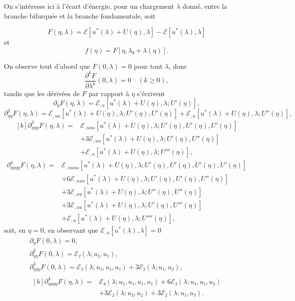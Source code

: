 \documentclass[12pt, final]{amsart}
\theoremstyle{definition}
\begin{document}
On s'intéresse ici à l'écart d'énergie, pour un chargement \(λ\) donné, entre la
branche bifurquée et la branche fondamentale, soit

\begin{equation}
  F(η, λ) = ℰ[u^{\ast}(λ) + U(η), λ] - ℰ[u^{\ast}(λ), λ]
\end{equation}
et
\begin{equation}
  f(η) = F [η, λ₀ + λ(η)].
\end{equation}

On observe tout d'abord que \(F(0, λ) = 0\) pour tout \(λ\), donc
\begin{equation}
  \frac{∂^k F}{∂ λ^k}(0, λ) = 0 \quad(k \geq 0),
\end{equation}
tandis que les dérivées de \(F\) par rapport à \(η\) s'écrivent
\begin{equation}
  ∂_{η} F(η, λ) = ℰ_{, u}[u^{\ast}(λ) + U(η), λ; U'(η)],
\end{equation}
\begin{equation}
  ∂_{ηη}^2 F(η, λ) = ℰ_{, uu} [u^{\ast}(λ) + U(η), λ; U'(η), U'(η)] + ℰ_{, u} [u^{\ast}(λ) + U(η), λ; U''(η)],
\end{equation}
\begin{equation*}
  \begin{aligned}[b]
    ∂_{ηηη}^3 F(η, λ) ={}
    & ℰ_{, uuu} [u^{\ast}(λ) + U(η), λ; U'(η), U'(η), U'(η)]\\
    & + 3ℰ_{, uu}[u^{\ast}(λ) + U(η), λ; U'(η), U''(η)]\\
    & + ℰ_{, u}[u^{\ast}(λ) + U(η), λ; U'''(η)],
  \end{aligned}
\end{equation*}
\begin{eqnarray}
  ∂_{ηηηη}^4 F(η, λ) ={}
  & ℰ_{, uuuu}[u^{\ast}(λ) + U(η), λ; U'(η), U'(η), U'(η), U'(η)]\\
  & + 6ℰ_{,uuu}[u^{\ast}(λ) + U(η), λ; U'(η), U'(η), U''(η)]\\
  & + 3ℰ_{, uu}[u^{\ast}(λ) + U(η), λ; U''(η), U''(η)]\\
  & + 3ℰ_{, uu}[u^{\ast}(λ) + U(η), λ; U'(η), U'''(η)]\\
  & +ℰ_{, u}[u^{\ast}(λ) + U(η), λ ; U''''(η)],
\end{eqnarray}
soit, en \(η = 0\), en observant que \(ℰ_{, u}[u^{\ast}(λ), λ] = 0\)
\begin{gather}
  ∂_{η} F(0, λ) = 0,\\
  ∂_{ηη}^2 F(0, λ) =ℰ₂(λ ; u₁, u₁),\\
  ∂_{ηηη}^3 F(0, λ) = ℰ₃(λ; u₁, u₁, u₁) + 3ℰ₂(λ; u₁, u₂),\\
  \begin{aligned}[b]
    ∂_{ηηηη}^4 F(η, λ) ={}
    & ℰ₄(λ; u₁, u₁, u₁, u₁) + 6ℰ₃(λ; u₁, u₁, u₂)\\
    & + 3ℰ₂(λ; u₂, u₂) + 3ℰ₂(λ; u₁, u₃).
  \end{aligned}
\end{gather}
\end{document}
